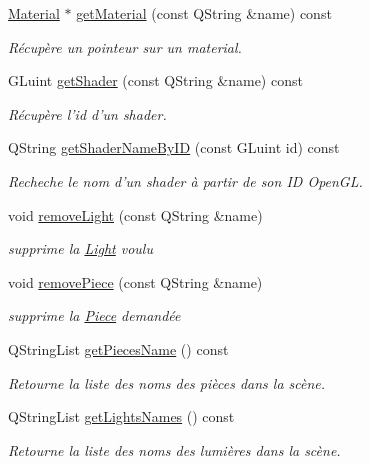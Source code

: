 \begin{DoxyCompactItemize}
\hyperlink{class_material}{Material} $\ast$ \hyperlink{class_scene_afb93862254b6869533d7487c56133adb}{get\+Material} (const Q\+String \&name) const 
\begin{DoxyCompactList}\small\item\em Récupère un pointeur sur un material. \end{DoxyCompactList}\item 
G\+Luint \hyperlink{class_scene_a957a47245453a8868a417396abf9adce}{get\+Shader} (const Q\+String \&name) const 
\begin{DoxyCompactList}\small\item\em Récupère l'id d'un shader. \end{DoxyCompactList}\item 
Q\+String \hyperlink{class_scene_af00f7d191f9277b3dbad125c54677d79}{get\+Shader\+Name\+By\+I\+D} (const G\+Luint id) const 
\begin{DoxyCompactList}\small\item\em Recheche le nom d'un shader à partir de son I\+D Open\+G\+L. \end{DoxyCompactList}\item 
void \hyperlink{class_scene_a9cf190091b9d7658142680a7703415ef}{remove\+Light} (const Q\+String \&name)
\begin{DoxyCompactList}\small\item\em supprime la \hyperlink{class_light}{Light} voulu \end{DoxyCompactList}\item 
void \hyperlink{class_scene_a65cda5cb0a108d51f4f82eac9aca6371}{remove\+Piece} (const Q\+String \&name)
\begin{DoxyCompactList}\small\item\em supprime la \hyperlink{class_piece}{Piece} demandée \end{DoxyCompactList}\item 
Q\+String\+List \hyperlink{class_scene_a2ea5207a5d9ec6e4081f12896b01d9d5}{get\+Pieces\+Name} () const 
\begin{DoxyCompactList}\small\item\em Retourne la liste des noms des pièces dans la scène. \end{DoxyCompactList}\item 
Q\+String\+List \hyperlink{class_scene_a215d616b6132f30a6bfc66ea4a3cfb95}{get\+Lights\+Names} () const 
\begin{DoxyCompactList}\small\item\em Retourne la liste des noms des lumières dans la scène. \end{DoxyCompactList}\item 

\end{DoxyCompactItemize}
